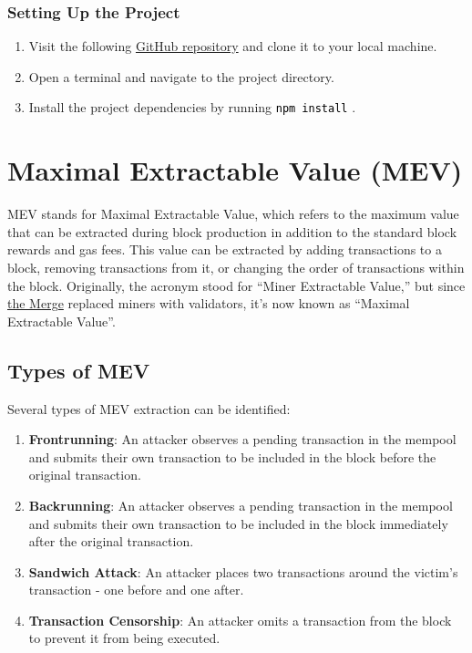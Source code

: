 \documentclass[12pt]{article}
\newcommand{\codegrey}[1]{%
  \texttt{\colorbox{black!4}{\textcolor{black}{#1}}}%
}
\begin{document}
\subsubsection*{Setting Up the Project}

\begin{enumerate}
    \item Visit the following \href{https://github.com/radovluk/Smart-Contract-Exercise/tree/main/08-Maximal-Extractable-Value/task/task-code}{GitHub repository} and clone it to your local machine.
    \item Open a terminal and navigate to the project directory.
    \item Install the project dependencies by running \codegrey{npm install}.
\end{enumerate}

\section{Maximal Extractable Value (MEV)}

MEV stands for Maximal Extractable Value, which refers to the maximum value that can be extracted during block production in addition to the standard block rewards and gas fees. This value can be extracted by adding transactions to a block, removing transactions from it, or changing the order of transactions within the block. Originally, the acronym stood for ``Miner Extractable Value,'' but since \href{https://ethereum.org/en/roadmap/merge/}{the Merge} replaced miners with validators, it's now known as ``Maximal Extractable Value''.

\subsection*{Types of MEV}

Several types of MEV extraction can be identified:

\begin{enumerate}
  \item \textbf{Frontrunning}: An attacker observes a pending transaction in the mempool and submits their own transaction to be included in the block before the original transaction.
  \item \textbf{Backrunning}: An attacker observes a pending transaction in the mempool and submits their own transaction to be included in the block immediately after the original transaction.
  \item \textbf{Sandwich Attack}: An attacker places two transactions around the victim's transaction - one before and one after.
  \item \textbf{Transaction Censorship}: An attacker omits a transaction from the block to prevent it from being executed.
\end{enumerate}
\end{document}
